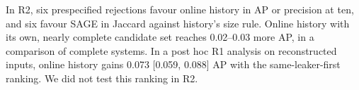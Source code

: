In R2, six prespecified rejections favour online history in AP or precision at ten, and six favour SAGE in Jaccard against history's size rule.
Online history with its own, nearly complete candidate set reaches 0.02--0.03 more AP, in a comparison of complete systems.
In a post hoc R1 analysis on reconstructed inputs, online history gains 0.073 [0.059, 0.088] AP with the same-leaker-first ranking.
We did not test this ranking in R2.

